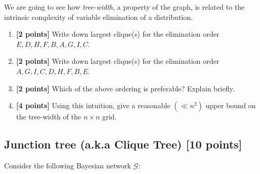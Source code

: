 \documentclass{article}
\newcommand{\Gcal}{\mathcal{G}}
\begin{document}
We are going to see how \emph{tree-width}, a property of the graph, is related to the intrinsic complexity of variable elimination of a distribution. 


\begin{enumerate}

\item \textbf{[2 points]} Write down largest clique(s) for the elimination order $ E, D, H, F, B, A, G, I, C $.






\item \textbf{[2 points]} Write down largest clique(s) for the elimination order $ A, G, I, C, D, H, F, B, E $. 




\item \textbf{[2 points]} Which of the above ordering is preferable? Explain briefly. 




\item \textbf{[4 points]} Using this intuition, give a reasonable $ (\ll n^2) $ upper bound on the tree-width of the $ n \times n $ grid. 





\end{enumerate}

\subsection{Junction tree {(a.k.a Clique Tree)} [10 points]}



Consider the following Bayesian network $ \Gcal $:
\begin{figure}[h]
\centering
{}
\end{figure}
\end{document}

